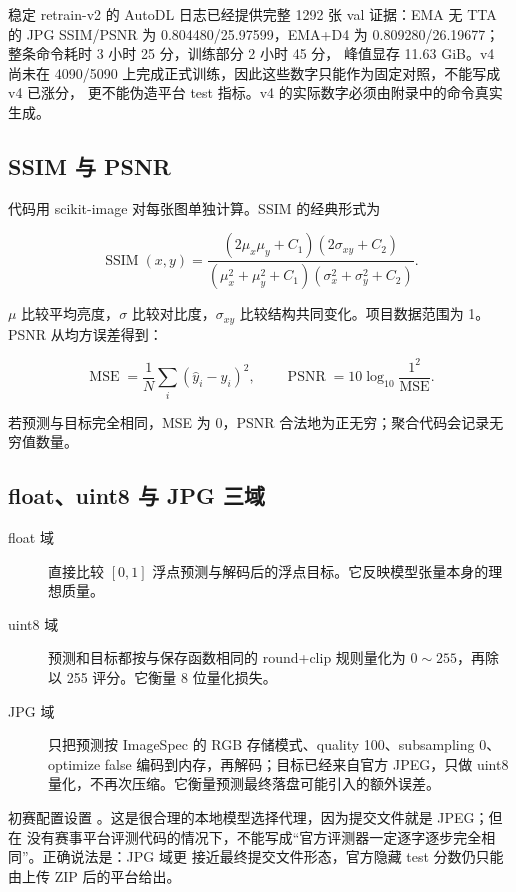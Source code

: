 \documentclass[12pt,a4paper,UTF8]{ctexart}
\newcommand{\code}[1]{\texttt{\detokenize{#1}}}
\begin{document}
稳定 retrain-v2 的 AutoDL 日志已经提供完整 1292 张 val 证据：EMA 无 TTA 的 JPG SSIM/PSNR 为
0.804480/25.97599，EMA+D4 为 0.809280/26.19677；整条命令耗时 3 小时 25 分，训练部分 2 小时 45 分，
峰值显存 11.63 GiB。v4 尚未在 4090/5090 上完成正式训练，因此这些数字只能作为固定对照，不能写成 v4 已涨分，
更不能伪造平台 test 指标。v4 的实际数字必须由附录中的命令真实生成。

\subsection{SSIM 与 PSNR}

代码用 scikit-image 对每张图单独计算。SSIM 的经典形式\cite{ssim}为

\begin{equation}
  \operatorname{SSIM}(x,y)=
  \frac{(2\mu_x\mu_y+C_1)(2\sigma_{xy}+C_2)}
       {(\mu_x^2+\mu_y^2+C_1)(\sigma_x^2+\sigma_y^2+C_2)}.
\end{equation}

$\mu$ 比较平均亮度，$\sigma$ 比较对比度，$\sigma_{xy}$ 比较结构共同变化。项目数据范围为 1。
PSNR 从均方误差得到：

\begin{equation}
  \operatorname{MSE}=\frac1N\sum_i(\hat y_i-y_i)^2,
  \qquad
  \operatorname{PSNR}=10\log_{10}\frac{1^2}{\operatorname{MSE}}.
\end{equation}

若预测与目标完全相同，MSE 为 0，PSNR 合法地为正无穷；聚合代码会记录无穷值数量。

\subsection{float、uint8 与 JPG 三域}

\begin{description}
  \item[float 域] 直接比较 $[0,1]$ 浮点预测与解码后的浮点目标。它反映模型张量本身的理想质量。
  \item[uint8 域] 预测和目标都按与保存函数相同的 round+clip 规则量化为 $0\sim255$，再除以 255 评分。它衡量 8 位量化损失。
  \item[JPG 域] 只把预测按 ImageSpec 的 RGB 存储模式、quality 100、subsampling 0、optimize false 编码到内存，再解码；目标已经来自官方 JPEG，只做 uint8 量化，不再次压缩。它衡量预测最终落盘可能引入的额外误差。
\end{description}

初赛配置设置 \code{primary_domain=jpg}。这是很合理的本地模型选择代理，因为提交文件就是 JPEG；但在
没有赛事平台评测代码的情况下，不能写成“官方评测器一定逐字逐步完全相同”。正确说法是：JPG 域更
接近最终提交文件形态，官方隐藏 test 分数仍只能由上传 ZIP 后的平台给出。
\end{document}
